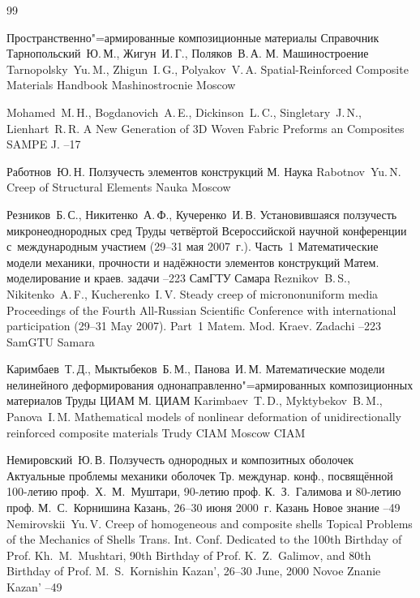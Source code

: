 \begin{thebibliography}{99}

\book Пространственно"=армированные композиционные материалы
\bookinfo Справочник
\by Тарнопольский~Ю.\,М., Жигун~И.\,Г., Поляков~В.\,А.
\publaddr М.
\publ Машиностроение
\misctransl
\by  Tarnopolsky~Yu.\,M.,  Zhigun~I.\,G.,  Polyakov~V.\,A.
\book Spatial-Reinforced Composite Materials 
\bookinfo Handbook
\publ Mashinostrocnie
\publaddr Moscow 

\by Mohamed~M.\,H., Bogdanovich~A.\,E., Dickinson~L.\,C., Singletary~J.\,N., Lienhart~R.\,R.
\paper A New Generation of 3D Woven Fabric Preforms an Composites
\jour SAMPE J.
--17

\by Работнов~Ю.\,Н.
\book Ползучесть элементов конструкций
\publaddr М.
\publ Наука
\misctransl
\by  Rabotnov~Yu.\,N.
\book Creep of Structural Elements
\publ Nauka
\publaddr Moscow

\by Резников~Б.\,С., Никитенко~А.\,Ф., Кучеренко~И.\,В.
\paper Установившаяся ползучесть микронеоднородных сред
\inbook Труды четвёртой Всероссийской научной конференции с~международным участием \rm (29--31 мая 2007~г.). Часть~1
\bookinfo Математические модели механики, прочности и надёжности элементов конструкций
\serial Матем. моделирование и краев. задачи
--223
\publ СамГТУ
\publaddr Самара
\misctransl
\by Reznikov~B.\,S., Nikitenko~A.\,F., Kucherenko~I.\,V.
\paper Steady creep of micrononuniform media
\inbook Proceedings of the Fourth All-Russian Scientific Conference with international participation \rm (29--31 May 2007). Part~1
\serial Matem. Mod. Kraev. Zadachi
--223
\publ SamGTU
\publaddr Samara


\by Каримбаев~Т.\,Д., Мыктыбеков~Б.\,М., Панова~И.\,М.
\book Математические модели нелинейного деформирования однонаправленно"=армированных композиционных материалов
\serial Труды ЦИАМ
\publaddr М.
\publ ЦИАМ
\misctransl 
\by Karimbaev~T.\,D., Myktybekov~B.\,M.,  Panova~I.\,M.
\book Mathematical models of nonlinear deformation of unidirectionally reinforced composite materials
\serial Trudy CIAM 
\publaddr Moscow
\publ CIAM


\by Немировский~Ю.\,В.
\paper Ползучесть однородных и композитных оболочек
\inbook Актуальные проблемы механики оболочек
\bookinfo Тр. междунар. конф., посвящённой 100-летию проф.~Х.~М.~Муштари, 90-летию проф. К.~З.~Галимова
и 80-летию проф. М.~С.~Корнишина 
\procinfo Казань, 26--30 июня 2000~г.
\publaddr Казань
\publ Новое знание
--49
\misctransl
\by Nemirovskii~Yu.\,V.
\paper Creep of homogeneous and composite shells
\inbook Topical Problems of the Mechanics of Shells
\bookinfo Trans. Int. Conf. Dedicated to the 100th Birthday of Prof. Kh.~M.~Mushtari, 90th Birthday of Prof. K.~Z.~Galimov, and 80th Birthday of Prof. M.~S.~Kornishin
\procinfo Kazan', 26--30 June, 2000
\publ Novoe Znanie
\publaddr Kazan'
--49




\end{thebibliography}

